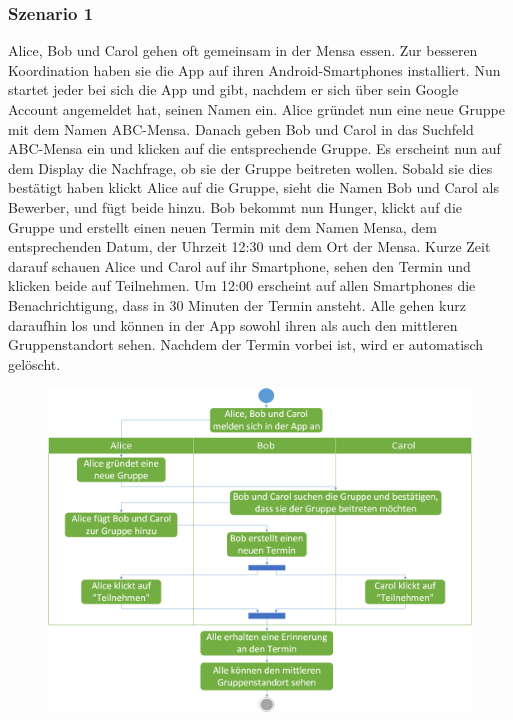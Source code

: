 \documentclass{scrartcl}
\begin{document}
	\subsubsection{Szenario 1}
	Alice, Bob und Carol gehen oft gemeinsam in der Mensa essen. Zur besseren Koordination haben sie die App auf ihren Android-Smartphones installiert.
	Nun startet jeder bei sich die App und gibt, nachdem er sich über sein Google Account angemeldet hat, seinen Namen ein.
	Alice gründet nun eine neue Gruppe mit dem Namen ABC-Mensa. Danach geben Bob und Carol in das Suchfeld ABC-Mensa ein und klicken auf die entsprechende Gruppe.
	Es erscheint nun auf dem Display die Nachfrage, ob sie der Gruppe beitreten wollen. Sobald sie dies bestätigt haben klickt Alice auf die Gruppe,
	sieht die Namen Bob und Carol als Bewerber, und fügt beide hinzu.
	Bob bekommt nun Hunger, klickt auf die Gruppe und erstellt einen neuen Termin mit dem Namen Mensa, dem entsprechenden Datum, der Uhrzeit 12:30 und dem Ort der Mensa.
	Kurze Zeit darauf schauen Alice und Carol auf ihr Smartphone, sehen den Termin und klicken beide auf \glqq{}Teilnehmen\grqq{}.
	Um 12:00 erscheint auf allen Smartphones die Benachrichtigung, dass in 30 Minuten der Termin ansteht.
	Alle gehen kurz daraufhin los und können in der App sowohl ihren als auch den mittleren Gruppenstandort sehen.
	Nachdem der Termin vorbei ist, wird er automatisch gelöscht.
	\begin{figure}[h]
	\centering
	\includegraphics[width=\textwidth]{Szenario1}
	\end{figure}
	
	\newpage
	
\end{document}

